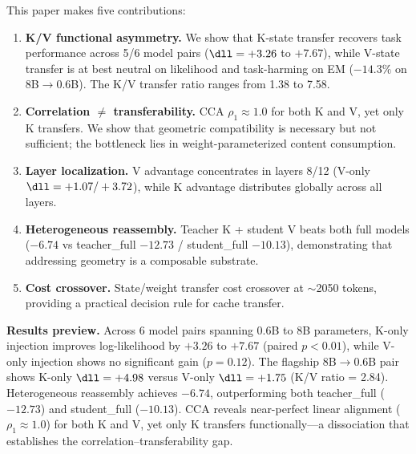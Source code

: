 This paper makes five contributions:
\begin{enumerate}
  \item \textbf{K/V functional asymmetry.}
    We show that K-state transfer recovers task performance across 5/6 model pairs
    ($\dll = +3.26$ to $+7.67$), while V-state transfer is at best neutral
    on likelihood and task-harming on EM ($-14.3\%$ on 8B$\to$0.6B).
    The K/V transfer ratio ranges from 1.38 to 7.58.

  \item \textbf{Correlation $\neq$ transferability.}
    CCA $\rho_1 \approx 1.0$ for both K and V, yet only K transfers.
    We show that geometric compatibility is necessary but not sufficient;
    the bottleneck lies in weight-parameterized content consumption.

  \item \textbf{Layer localization.}
    V advantage concentrates in layers 8/12
    (V-only $\dll = +1.07 / +3.72$),
    while K advantage distributes globally across all layers.

  \item \textbf{Heterogeneous reassembly.}
    Teacher K + student V beats both full models
    ($-6.74$ vs teacher\_full $-12.73$ / student\_full $-10.13$),
    demonstrating that addressing geometry is a composable substrate.

  \item \textbf{Cost crossover.}
    State/weight transfer cost crossover at $\sim$2050 tokens,
    providing a practical decision rule for cache transfer.
\end{enumerate}

\textbf{Results preview.}
Across 6 model pairs spanning 0.6B to 8B parameters,
K-only injection improves log-likelihood by $+3.26$ to $+7.67$ (paired $p < 0.01$),
while V-only injection shows no significant gain ($p = 0.12$).
The flagship 8B$\to$0.6B pair shows K-only $\dll = +4.98$
versus V-only $\dll = +1.75$ (K/V ratio = 2.84).
Heterogeneous reassembly achieves $-6.74$,
outperforming both teacher\_full ($-12.73$) and student\_full ($-10.13$).
CCA reveals near-perfect linear alignment ($\rho_1 \approx 1.0$) for both K and V,
yet only K transfers functionally---a dissociation that establishes
the correlation--transferability gap.
